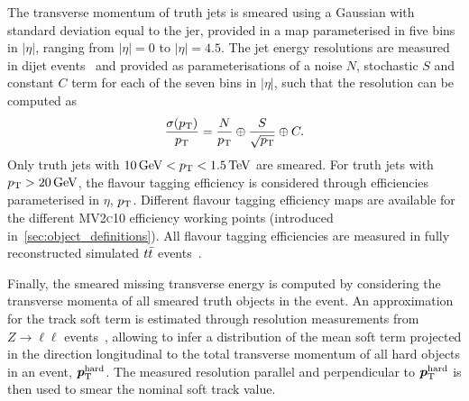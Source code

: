 The transverse momentum of truth jets is smeared using a Gaussian with standard deviation equal to the \gls{jer}, provided in a map parameterised in five bins in $\vert\eta\vert$, ranging from $\vert\eta\vert = 0$ to $\vert\eta\vert = 4.5$. The jet energy resolutions are measured in dijet events~\cite{Aad:2020flx} and provided as parameterisations of a noise $N$, stochastic $S$ and constant $C$ term for each of the seven bins in $\vert\eta\vert$, such that the resolution can be computed as
\begin{equation}
	\frac{\sigma(p_{\mathrm{T}})}{p_{\mathrm{T}}} = \frac{N}{p_{\mathrm{T}}}\oplus\frac{S}{\sqrt{p_{\mathrm{T}}}}\oplus C.
\end{equation}
Only truth jets with $\SI{10}{\GeV} < \pt < \SI{1.5}{\TeV}$ are smeared. For truth jets with $\pt > \SI{20}{\GeV}$, the flavour tagging efficiency is considered through efficiencies parameterised in $\eta$, $p_{\mathrm{T}}$. Different flavour tagging efficiency maps are available for the different \textsc{MV2c10} efficiency working points (introduced in~\cref{sec:object_definitions}). All flavour tagging efficiencies are measured in fully reconstructed simulated $t\bar{t}$ events~\cite{FTAG-2018-01}.

Finally, the smeared missing transverse energy is computed by considering the transverse momenta of all smeared truth objects in the event. An approximation for the track soft term is estimated through resolution measurements from $Z\rightarrow \ell\ell$ events~\cite{ATLAS-CONF-2018-023}, allowing to infer a distribution of the mean soft term projected in the direction longitudinal to the total transverse momentum of all hard objects in an event, $\makemebold{p}_\mathrm{T}^\mathrm{hard}$. The measured resolution parallel and perpendicular to $\makemebold{p}_\mathrm{T}^\mathrm{hard}$ is then used to smear the nominal soft track value.

